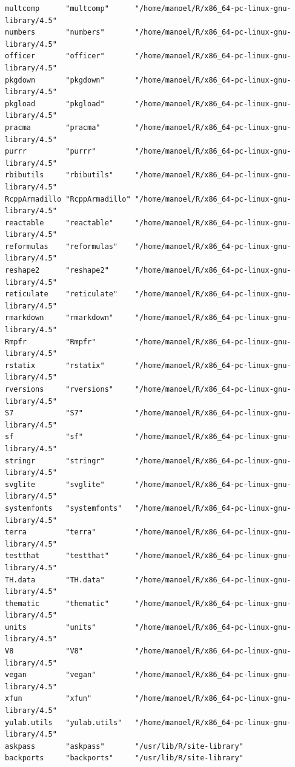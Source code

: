 \documentclass[
  letterpaper,
  DIV=11,
  numbers=noendperiod]{scrreprt}
\begin{document}
\begin{verbatim}
multcomp      "multcomp"      "/home/manoel/R/x86_64-pc-linux-gnu-library/4.5"
numbers       "numbers"       "/home/manoel/R/x86_64-pc-linux-gnu-library/4.5"
officer       "officer"       "/home/manoel/R/x86_64-pc-linux-gnu-library/4.5"
pkgdown       "pkgdown"       "/home/manoel/R/x86_64-pc-linux-gnu-library/4.5"
pkgload       "pkgload"       "/home/manoel/R/x86_64-pc-linux-gnu-library/4.5"
pracma        "pracma"        "/home/manoel/R/x86_64-pc-linux-gnu-library/4.5"
purrr         "purrr"         "/home/manoel/R/x86_64-pc-linux-gnu-library/4.5"
rbibutils     "rbibutils"     "/home/manoel/R/x86_64-pc-linux-gnu-library/4.5"
RcppArmadillo "RcppArmadillo" "/home/manoel/R/x86_64-pc-linux-gnu-library/4.5"
reactable     "reactable"     "/home/manoel/R/x86_64-pc-linux-gnu-library/4.5"
reformulas    "reformulas"    "/home/manoel/R/x86_64-pc-linux-gnu-library/4.5"
reshape2      "reshape2"      "/home/manoel/R/x86_64-pc-linux-gnu-library/4.5"
reticulate    "reticulate"    "/home/manoel/R/x86_64-pc-linux-gnu-library/4.5"
rmarkdown     "rmarkdown"     "/home/manoel/R/x86_64-pc-linux-gnu-library/4.5"
Rmpfr         "Rmpfr"         "/home/manoel/R/x86_64-pc-linux-gnu-library/4.5"
rstatix       "rstatix"       "/home/manoel/R/x86_64-pc-linux-gnu-library/4.5"
rversions     "rversions"     "/home/manoel/R/x86_64-pc-linux-gnu-library/4.5"
S7            "S7"            "/home/manoel/R/x86_64-pc-linux-gnu-library/4.5"
sf            "sf"            "/home/manoel/R/x86_64-pc-linux-gnu-library/4.5"
stringr       "stringr"       "/home/manoel/R/x86_64-pc-linux-gnu-library/4.5"
svglite       "svglite"       "/home/manoel/R/x86_64-pc-linux-gnu-library/4.5"
systemfonts   "systemfonts"   "/home/manoel/R/x86_64-pc-linux-gnu-library/4.5"
terra         "terra"         "/home/manoel/R/x86_64-pc-linux-gnu-library/4.5"
testthat      "testthat"      "/home/manoel/R/x86_64-pc-linux-gnu-library/4.5"
TH.data       "TH.data"       "/home/manoel/R/x86_64-pc-linux-gnu-library/4.5"
thematic      "thematic"      "/home/manoel/R/x86_64-pc-linux-gnu-library/4.5"
units         "units"         "/home/manoel/R/x86_64-pc-linux-gnu-library/4.5"
V8            "V8"            "/home/manoel/R/x86_64-pc-linux-gnu-library/4.5"
vegan         "vegan"         "/home/manoel/R/x86_64-pc-linux-gnu-library/4.5"
xfun          "xfun"          "/home/manoel/R/x86_64-pc-linux-gnu-library/4.5"
yulab.utils   "yulab.utils"   "/home/manoel/R/x86_64-pc-linux-gnu-library/4.5"
askpass       "askpass"       "/usr/lib/R/site-library"                       
backports     "backports"     "/usr/lib/R/site-library"                       

\end{verbatim}
\end{document}
